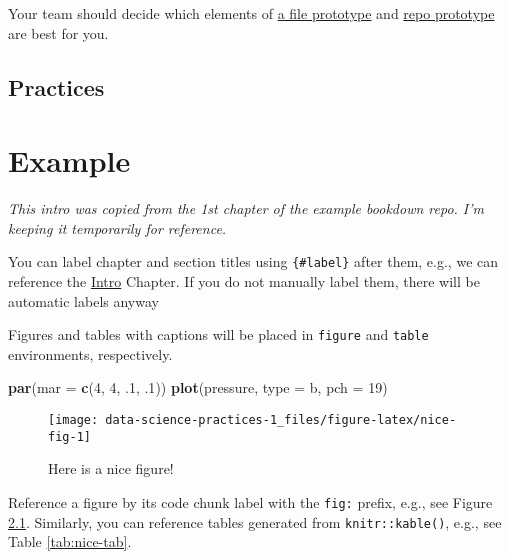 \documentclass[
]{book}
\newenvironment{Shaded}{\begin{snugshade}}{\end{snugshade}}
\newcommand{\DataTypeTok}[1]{\textcolor[rgb]{0.13,0.29,0.53}{#1}}
\newcommand{\DecValTok}[1]{\textcolor[rgb]{0.00,0.00,0.81}{#1}}
\newcommand{\FloatTok}[1]{\textcolor[rgb]{0.00,0.00,0.81}{#1}}
\newcommand{\KeywordTok}[1]{\textcolor[rgb]{0.13,0.29,0.53}{\textbf{#1}}}
\newcommand{\NormalTok}[1]{#1}
\newcommand{\StringTok}[1]{\textcolor[rgb]{0.31,0.60,0.02}{#1}}
\begin{document}
\begin{enumerate}
  Your team should decide which elements of \href{https://ouhscbbmc.github.io/data-science-practices-1/file-prototype.html}{a file prototype} and \href{https://ouhscbbmc.github.io/data-science-practices-1/repo-prototype.html}{repo prototype} are best for you.
\end{enumerate}

\hypertarget{practices}{%
\section{Practices}\label{practices}}

\hypertarget{example-bookdown}{%
\chapter{Example}\label{example-bookdown}}

\emph{This intro was copied from the 1st chapter of the example bookdown repo. I'm keeping it temporarily for reference.}

You can label chapter and section titles using \texttt{\{\#label\}} after them, e.g., we can reference the \protect\hyperlink{intro}{Intro} Chapter. If you do not manually label them, there will be automatic labels anyway

Figures and tables with captions will be placed in \texttt{figure} and \texttt{table} environments, respectively.

\begin{Shaded}
\begin{Highlighting}[]
\KeywordTok{par}\NormalTok{(}\DataTypeTok{mar =} \KeywordTok{c}\NormalTok{(}\DecValTok{4}\NormalTok{, }\DecValTok{4}\NormalTok{, }\FloatTok{.1}\NormalTok{, }\FloatTok{.1}\NormalTok{))}
\KeywordTok{plot}\NormalTok{(pressure, }\DataTypeTok{type =} \StringTok{\textquotesingle{}b\textquotesingle{}}\NormalTok{, }\DataTypeTok{pch =} \DecValTok{19}\NormalTok{)}
\end{Highlighting}
\end{Shaded}

\begin{figure}

{\centering \texttt{[image: data-science-practices-1\_files/figure-latex/nice-fig-1]} 

}

\caption{Here is a nice figure!}\label{fig:nice-fig}
\end{figure}

Reference a figure by its code chunk label with the \texttt{fig:} prefix, e.g., see Figure \ref{fig:nice-fig}. Similarly, you can reference tables generated from \texttt{knitr::kable()}, e.g., see Table \ref{tab:nice-tab}.
\end{document}
